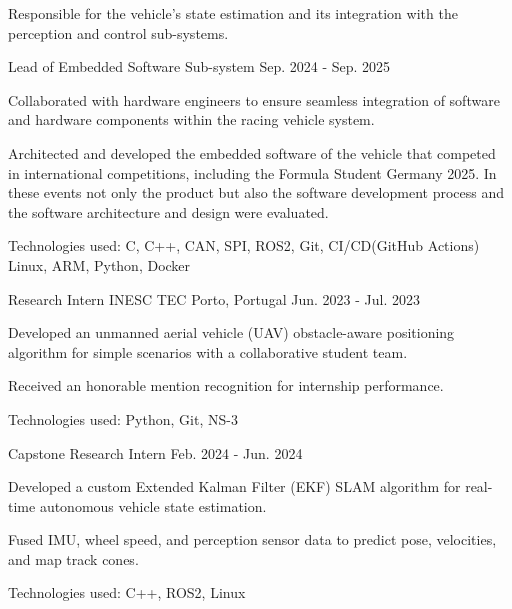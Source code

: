 \begin{cventries}
{\begin{cvitems}
        \item {Responsible for the vehicle's state estimation and its integration with the perception and control sub-systems.} 
      \end{cvitems}
    } 
    {Lead of Embedded Software Sub-system} 
    {Sep. 2024 - Sep. 2025} 
    {
      \begin{cvitems}
        \item {Collaborated with hardware engineers to ensure seamless integration of software and hardware components within the racing vehicle system.} 
        \item {Architected and developed the embedded software of the vehicle that competed in international competitions, including the Formula Student Germany 2025. In these events not only the product but also the software development process and the software architecture and design were evaluated.} 
        \item {Technologies used: C, C++, CAN, SPI, ROS2, Git, CI/CD(GitHub Actions) Linux, ARM, Python, Docker}
      \end{cvitems}
    }

  \cventrytwopositions
    {Research Intern}
    {INESC TEC}
    {Porto, Portugal}
    {Jun. 2023 - Jul. 2023}
    {
      \begin{cvitems}
        \item {Developed an unmanned aerial vehicle (UAV) obstacle-aware positioning algorithm for simple scenarios with a collaborative student team.}
        \item {Received an honorable mention recognition for internship performance.}
        \item {Technologies used: Python, Git, NS-3}
      \end{cvitems}
    }
    {Capstone Research Intern} 
    {Feb. 2024 - Jun. 2024} 
    {
      \begin{cvitems}
      \item {Developed a custom Extended Kalman Filter (EKF) SLAM algorithm for real-time autonomous vehicle state estimation.}
      \item {Fused IMU, wheel speed, and perception sensor data to predict pose, velocities, and map track cones.}
      \item {Technologies used: C++, ROS2, Linux}
      \end{cvitems}
    }

\end{cventries}
